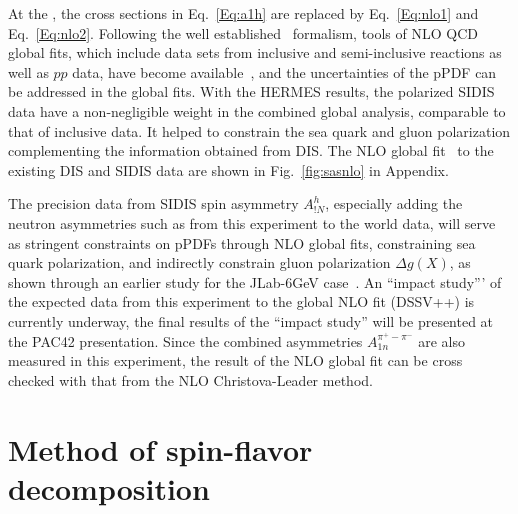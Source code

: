 At the \nloo, the cross sections in Eq.~\ref{Eq:a1h}  are replaced by Eq.~\ref{Eq:nlo1}
and Eq.~\ref{Eq:nlo2}. Following the well established~\cite{DSSV2008} formalism, 
tools of NLO QCD global fits,
which include data sets from inclusive and semi-inclusive reactions as well as $pp$ data,
have become available~\cite{DSSV2008}, and the uncertainties of the pPDF 
can be addressed in the global fits.
With the HERMES results, the polarized SIDIS data 
have a non-negligible weight in the combined global analysis, 
comparable to that of inclusive data. It helped 
to constrain the sea quark and gluon polarization complementing 
the information obtained from DIS.
The NLO global fit~\cite{DSSV2008} to the existing DIS and SIDIS data are shown in Fig.~\ref{fig:sasnlo} in Appendix. 

The precision data from SIDIS spin asymmetry $A_{!N}^h$, especially adding the 
 neutron asymmetries such as from this experiment  to the world data,  
will serve as stringent constraints on pPDFs through NLO global fits, constraining sea quark polarization, and indirectly constrain gluon polarization $\Delta g(X)$, as shown through an earlier study for the JLab-6GeV case~\cite{Jiang:2006qc}.  
An ``impact study''' of the expected data from this experiment to the global NLO fit (DSSV++) is currently underway, the final results of the ``impact study'' will be presented at the PAC42 presentation.
Since the combined asymmetries $A_{1n}^{\pi^+ -\pi^-}$ 
are also measured in this experiment,  the result of the NLO global fit 
can be  cross checked with that from the NLO Christova-Leader method.

\section{Method of spin-flavor decomposition}

